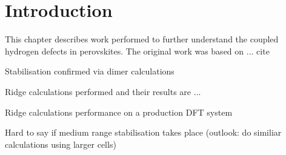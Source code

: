 \section{Introduction}
\label{sec:perovskites-introduction}

This chapter describes work performed to further understand the coupled hydrogen defects in perovskites.
The original work was based on ... cite

\bit
\item Stabilisation confirmed via dimer calculations
\item Ridge calculations performed and their results are ...
\item Ridge calculations performance on a production DFT system
\item Hard to say if medium range stabilisation takes place (outlook: do similiar calculations using larger cells)
\eit


\placeholder
